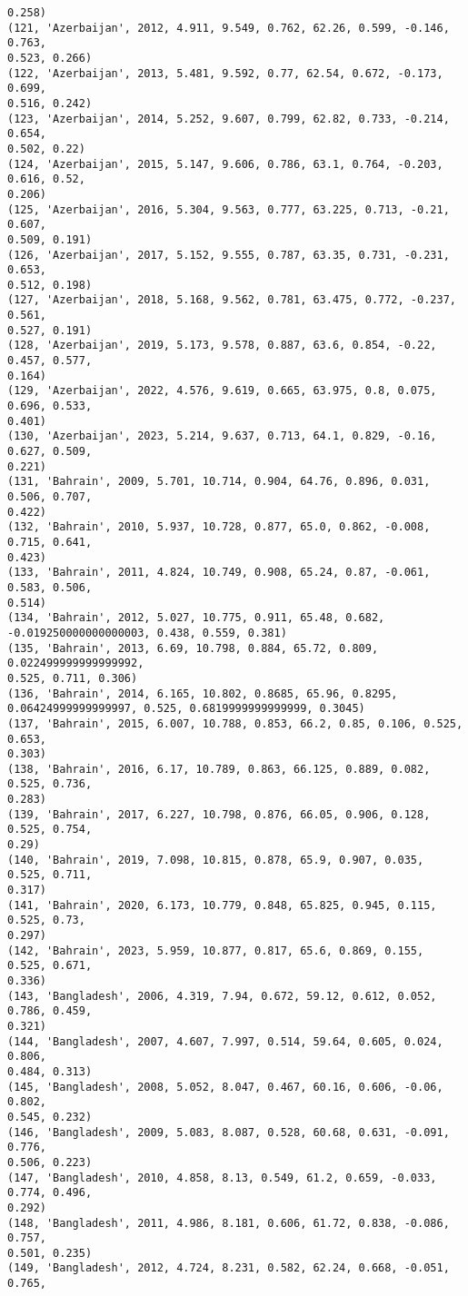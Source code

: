 \documentclass[11pt]{article}
\begin{document}
\begin{Verbatim}[commandchars=\\\{\}]
0.258)
(121, 'Azerbaijan', 2012, 4.911, 9.549, 0.762, 62.26, 0.599, -0.146, 0.763,
0.523, 0.266)
(122, 'Azerbaijan', 2013, 5.481, 9.592, 0.77, 62.54, 0.672, -0.173, 0.699,
0.516, 0.242)
(123, 'Azerbaijan', 2014, 5.252, 9.607, 0.799, 62.82, 0.733, -0.214, 0.654,
0.502, 0.22)
(124, 'Azerbaijan', 2015, 5.147, 9.606, 0.786, 63.1, 0.764, -0.203, 0.616, 0.52,
0.206)
(125, 'Azerbaijan', 2016, 5.304, 9.563, 0.777, 63.225, 0.713, -0.21, 0.607,
0.509, 0.191)
(126, 'Azerbaijan', 2017, 5.152, 9.555, 0.787, 63.35, 0.731, -0.231, 0.653,
0.512, 0.198)
(127, 'Azerbaijan', 2018, 5.168, 9.562, 0.781, 63.475, 0.772, -0.237, 0.561,
0.527, 0.191)
(128, 'Azerbaijan', 2019, 5.173, 9.578, 0.887, 63.6, 0.854, -0.22, 0.457, 0.577,
0.164)
(129, 'Azerbaijan', 2022, 4.576, 9.619, 0.665, 63.975, 0.8, 0.075, 0.696, 0.533,
0.401)
(130, 'Azerbaijan', 2023, 5.214, 9.637, 0.713, 64.1, 0.829, -0.16, 0.627, 0.509,
0.221)
(131, 'Bahrain', 2009, 5.701, 10.714, 0.904, 64.76, 0.896, 0.031, 0.506, 0.707,
0.422)
(132, 'Bahrain', 2010, 5.937, 10.728, 0.877, 65.0, 0.862, -0.008, 0.715, 0.641,
0.423)
(133, 'Bahrain', 2011, 4.824, 10.749, 0.908, 65.24, 0.87, -0.061, 0.583, 0.506,
0.514)
(134, 'Bahrain', 2012, 5.027, 10.775, 0.911, 65.48, 0.682,
-0.019250000000000003, 0.438, 0.559, 0.381)
(135, 'Bahrain', 2013, 6.69, 10.798, 0.884, 65.72, 0.809, 0.022499999999999992,
0.525, 0.711, 0.306)
(136, 'Bahrain', 2014, 6.165, 10.802, 0.8685, 65.96, 0.8295,
0.06424999999999997, 0.525, 0.6819999999999999, 0.3045)
(137, 'Bahrain', 2015, 6.007, 10.788, 0.853, 66.2, 0.85, 0.106, 0.525, 0.653,
0.303)
(138, 'Bahrain', 2016, 6.17, 10.789, 0.863, 66.125, 0.889, 0.082, 0.525, 0.736,
0.283)
(139, 'Bahrain', 2017, 6.227, 10.798, 0.876, 66.05, 0.906, 0.128, 0.525, 0.754,
0.29)
(140, 'Bahrain', 2019, 7.098, 10.815, 0.878, 65.9, 0.907, 0.035, 0.525, 0.711,
0.317)
(141, 'Bahrain', 2020, 6.173, 10.779, 0.848, 65.825, 0.945, 0.115, 0.525, 0.73,
0.297)
(142, 'Bahrain', 2023, 5.959, 10.877, 0.817, 65.6, 0.869, 0.155, 0.525, 0.671,
0.336)
(143, 'Bangladesh', 2006, 4.319, 7.94, 0.672, 59.12, 0.612, 0.052, 0.786, 0.459,
0.321)
(144, 'Bangladesh', 2007, 4.607, 7.997, 0.514, 59.64, 0.605, 0.024, 0.806,
0.484, 0.313)
(145, 'Bangladesh', 2008, 5.052, 8.047, 0.467, 60.16, 0.606, -0.06, 0.802,
0.545, 0.232)
(146, 'Bangladesh', 2009, 5.083, 8.087, 0.528, 60.68, 0.631, -0.091, 0.776,
0.506, 0.223)
(147, 'Bangladesh', 2010, 4.858, 8.13, 0.549, 61.2, 0.659, -0.033, 0.774, 0.496,
0.292)
(148, 'Bangladesh', 2011, 4.986, 8.181, 0.606, 61.72, 0.838, -0.086, 0.757,
0.501, 0.235)
(149, 'Bangladesh', 2012, 4.724, 8.231, 0.582, 62.24, 0.668, -0.051, 0.765,

\end{Verbatim}
\end{document}
